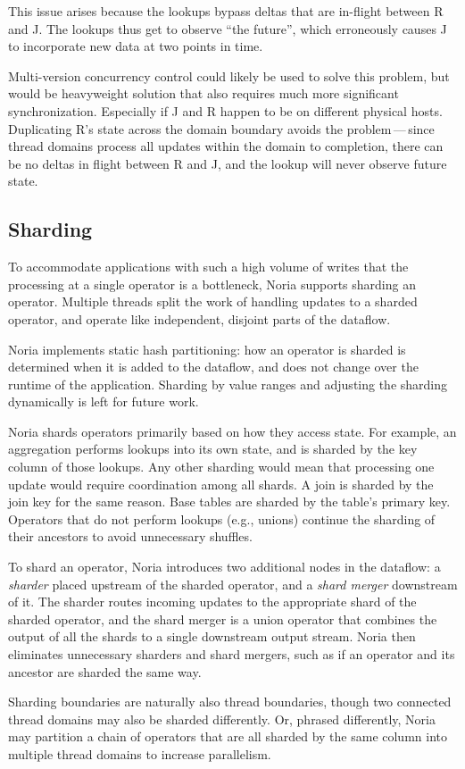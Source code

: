 This issue arises because the lookups bypass deltas that are in-flight between R
and J. The lookups thus get to observe ``the future'', which erroneously causes
J to incorporate new data at two points in time.

Multi-version concurrency control could likely be used to solve this problem,
but would be heavyweight solution that also requires much more significant
synchronization. Especially if J and R happen to be on different physical hosts.
Duplicating R's state across the domain boundary avoids the problem\,---\,since
thread domains process all updates within the domain to completion, there can be
no deltas in flight between R and J, and the lookup will never observe future
state.

\subsection{Sharding}
\label{s:noria:sharding}

To accommodate applications with such a high volume of writes that the
processing at a single operator is a bottleneck, Noria supports sharding an
operator. Multiple threads split the work of handling updates to a sharded
operator, and operate like independent, disjoint parts of the dataflow.

Noria implements static hash partitioning: how an operator is sharded is
determined when it is added to the dataflow, and does not change over the
runtime of the application. Sharding by value ranges and adjusting the sharding
dynamically is left for future work.

Noria shards operators primarily based on how they access state. For example, an
aggregation performs lookups into its own state, and is sharded by the key
column of those lookups. Any other sharding would mean that processing one
update would require coordination among all shards. A join is sharded by the
join key for the same reason. Base tables are sharded by the table's primary
key. Operators that do not perform lookups (e.g., unions) continue the sharding
of their ancestors to avoid unnecessary shuffles.

To shard an operator, Noria introduces two additional nodes in the dataflow: a
\emph{sharder} placed upstream of the sharded operator, and a \emph{shard
merger} downstream of it. The sharder routes incoming updates to the appropriate
shard of the sharded operator, and the shard merger is a union operator that
combines the output of all the shards to a single downstream output stream.
Noria then eliminates unnecessary sharders and shard mergers, such as if an
operator and its ancestor are sharded the same way.

Sharding boundaries are naturally also thread boundaries, though two connected
thread domains may also be sharded differently. Or, phrased differently, Noria
may partition a chain of operators that are all sharded by the same column into
multiple thread domains to increase parallelism.

